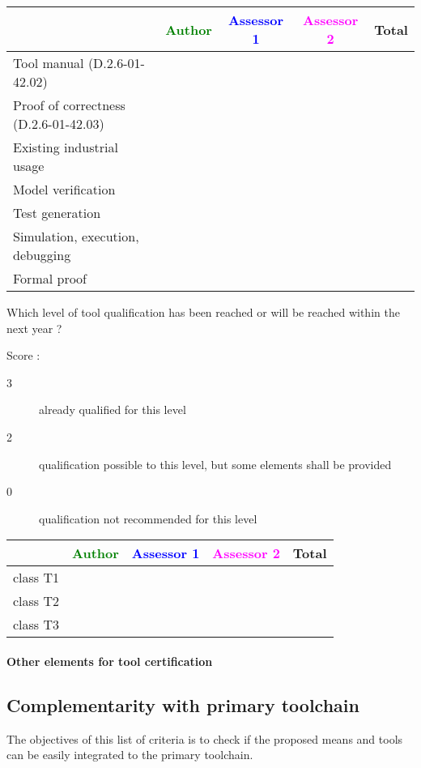\begin{tabular}{|l | c | c | c | c|}
\hline
& \textcolor{green}{Author} & \textcolor{blue}{Assessor 1} & \textcolor{magenta}{Assessor 2} & Total \\
\hline 
Tool manual (D.2.6-01-42.02) & & & &  \\
\hline
Proof of correctness (D.2.6-01-42.03)   & & & & \\
\hline
Existing industrial  usage  & & & & \\
\hline
Model verification & & & & \\
\hline
Test generation & & & & \\
\hline
Simulation, execution, debugging & & & & \\
\hline
Formal proof & & & & \\
\hline
\end{tabular}


Which level of tool qualification has been reached or will be reached within the next year ?


Score :
\begin{description}
\item[3] already qualified for this level
\item[2] qualification possible to this level, but some elements shall be provided
\item[0] qualification not recommended for this level
\end{description}


\begin{tabular}{|l | c | c | c | c|}
\hline
& \textcolor{green}{Author} & \textcolor{blue}{Assessor 1} & \textcolor{magenta}{Assessor 2} & Total \\
\hline 
class T1 & & & &  \\
\hline
class T2   & & & & \\
\hline
class T3  & & & & \\
\hline
\end{tabular}

\paragraph{Other elements for tool certification}


\subsection{Complementarity with primary toolchain}

The objectives of this list of criteria is to check if the proposed means and tools can be easily integrated to the primary toolchain.

